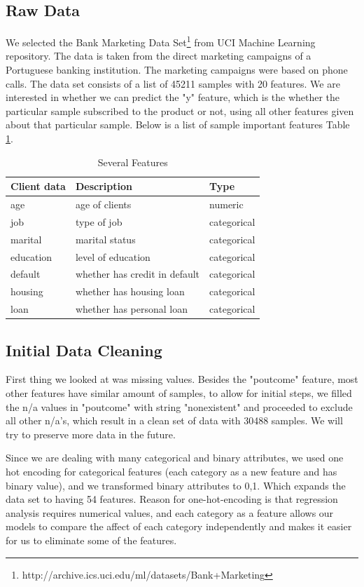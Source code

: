 \documentclass[forprint]{mytemplate}
\begin{document}
\begin{multicols}{2}
\subsection{Raw Data}
We selected the Bank Marketing Data Set\footnote{http://archive.ics.uci.edu/ml/datasets/Bank+Marketing} from UCI Machine Learning repository. The data is taken from the direct marketing campaigns of a Portuguese banking institution. The marketing campaigns were based on phone calls. The data set consists of a list of 45211 samples with 20 features. We are interested in whether we can predict the "y" feature, which is the whether the particular sample subscribed to the product or not, using all other features given about that particular sample. Below is a list of sample important features {\color{red}Table \ref{t01}}.
\begin{table}[H]
  \centering
  \begin{tabular}{|l|l|l|}
     \hline
Client data & Description&Type \\ \hline
age & age of clients &numeric\\ \hline
 job & type of job&categorical\\ \hline
 marital & marital status&categorical\\ \hline
 education & level of education& categorical\\ \hline
 default & whether has credit in default& categorical\\ \hline
 housing & whether has housing loan& categorical\\ \hline
 loan  &whether has personal loan& categorical \\ \hline
   \end{tabular}
  \caption{Several Features}\label{t01}
\end{table}

\subsection{Initial Data Cleaning}
First thing we looked at was missing values. Besides the "poutcome" feature, most other features have similar amount of samples, to allow for initial steps, we filled the n/a values in "poutcome" with string "nonexistent" and proceeded to exclude all other n/a's, which result in a clean set of data with 30488 samples. We will try to preserve more data in the future.

Since we are dealing with many categorical and binary attributes, we used one hot encoding for categorical features (each category as a new feature and has binary value), and we transformed binary attributes to {0,1}. Which expands the data set to having 54 features. Reason for one-hot-encoding is that regression analysis requires numerical values, and each category as a feature allows our models to compare the affect of each category independently and makes it easier for us to eliminate some of the features.


\end{multicols}
\end{document}
